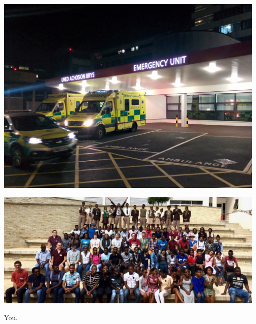 \documentclass{beamer}
\begin{document}
\begin{frame}
    \begin{center}
        \includegraphics[width=.8\textwidth]{assets/postdoc.jpg}
    \end{center}
\end{frame}

\begin{frame}
    \begin{center}
        \includegraphics[width=.9\textwidth]{assets/pycon.jpg}
    \end{center}
\end{frame}

\begin{frame}
    \begin{center}
        \Huge You.
    \end{center}
\end{frame}
\end{document}
